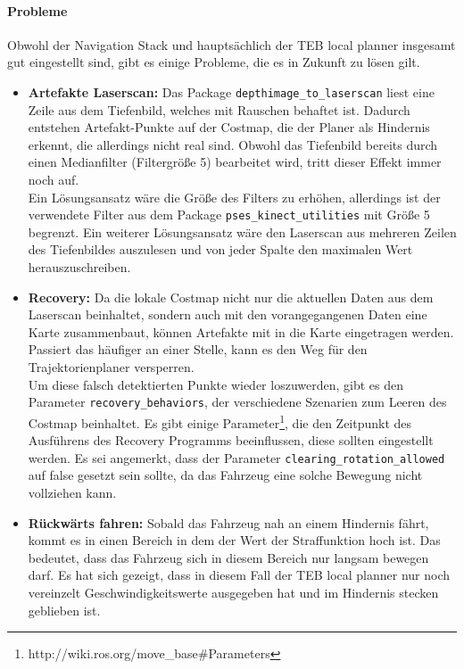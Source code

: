 \paragraph{Probleme}
Obwohl der Navigation Stack und haupts\"achlich der TEB local planner insgesamt gut eingestellt sind, gibt es einige Probleme, die es in Zukunft zu l\"osen gilt.
\begin{itemize}
	\item \textbf{Artefakte Laserscan:} Das Package \texttt{depthimage\_to\_laserscan} liest eine Zeile aus dem Tiefenbild, welches mit Rauschen behaftet ist. Dadurch entstehen Artefakt-Punkte auf der Costmap, die der Planer als Hindernis erkennt, die allerdings nicht real sind. Obwohl das Tiefenbild bereits durch einen Medianfilter (Filtergr\"o\ss{}e 5) bearbeitet wird, tritt dieser Effekt immer noch auf. \\
	Ein L\"osungsansatz w\"are die Gr\"o\ss{}e des Filters zu erh\"ohen, allerdings ist der verwendete Filter aus dem Package \texttt{pses\_kinect\_utilities} mit Gr\"o\ss{}e 5 begrenzt. Ein weiterer L\"osungsansatz w\"are den Laserscan aus mehreren Zeilen des Tiefenbildes auszulesen und von jeder Spalte den maximalen Wert herauszuschreiben. 
	\item \textbf{Recovery:} Da die lokale Costmap nicht nur die aktuellen Daten aus dem Laserscan beinhaltet, sondern auch mit den vorangegangenen Daten eine Karte zusammenbaut, k\"onnen Artefakte mit in die Karte eingetragen werden. Passiert das h\"aufiger an einer Stelle, kann es den Weg f\"ur den Trajektorienplaner versperren.\\
	Um diese falsch detektierten Punkte wieder loszuwerden, gibt es den Parameter \texttt{recovery\_behaviors}, der verschiedene Szenarien zum Leeren des Costmap beinhaltet. Es gibt einige Parameter\footnote{http://wiki.ros.org/move\_base\#Parameters}, die den Zeitpunkt des Ausf\"uhrens des Recovery Programms beeinflussen, diese sollten eingestellt werden. Es sei angemerkt, dass der Parameter \texttt{clearing\_rotation\_allowed} auf false gesetzt sein sollte, da das Fahrzeug eine solche Bewegung nicht vollziehen kann.
	\item \textbf{R\"uckw\"arts fahren:} Sobald das Fahrzeug nah an einem Hindernis f\"ahrt, kommt es in einen Bereich in dem der Wert der Straffunktion hoch ist. Das bedeutet, dass das Fahrzeug sich in diesem Bereich nur langsam bewegen darf. Es hat sich gezeigt, dass in diesem Fall der TEB local planner nur noch vereinzelt Geschwindigkeitswerte ausgegeben hat und im Hindernis stecken geblieben ist.\\

\end{itemize}
